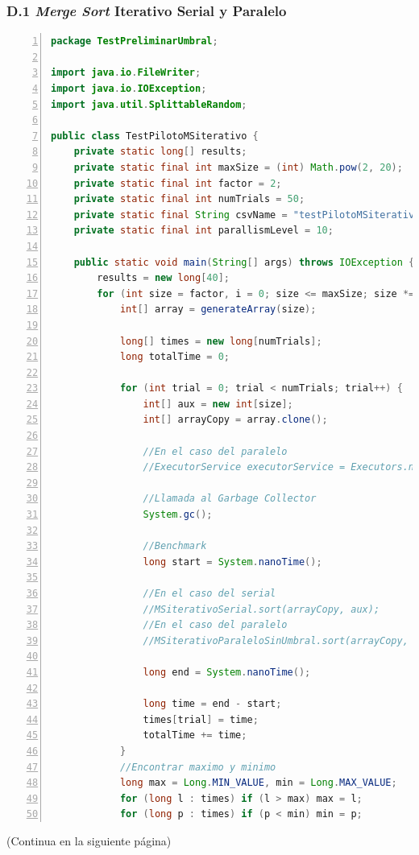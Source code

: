\documentclass[titlepage]{article}
\begin{document}
\subsubsection*{D.1 \textit{Merge Sort} Iterativo Serial y Paralelo}
\begin{lstlisting}[language=java, frame=single,numbers=left, float=h!, breaklines=true]
package TestPreliminarUmbral;

import java.io.FileWriter;
import java.io.IOException;
import java.util.SplittableRandom;

public class TestPilotoMSiterativo {
	private static long[] results;
	private static final int maxSize = (int) Math.pow(2, 20);
	private static final int factor = 2;
	private static final int numTrials = 50;
	private static final String csvName = "testPilotoMSiterativo.csv";
	private static final int parallismLevel = 10;
	
	public static void main(String[] args) throws IOException {
		results = new long[40];
		for (int size = factor, i = 0; size <= maxSize; size *= factor, i++) {
			int[] array = generateArray(size);
			
			long[] times = new long[numTrials];
			long totalTime = 0;
			
			for (int trial = 0; trial < numTrials; trial++) {
				int[] aux = new int[size];
				int[] arrayCopy = array.clone();
				
				//En el caso del paralelo
				//ExecutorService executorService = Executors.newFixedThreadPool(parallismLevel);
				
				//Llamada al Garbage Collector
				System.gc();
				
				//Benchmark
				long start = System.nanoTime();
				
				//En el caso del serial
				//MSiterativoSerial.sort(arrayCopy, aux);
				//En el caso del paralelo
				//MSiterativoParaleloSinUmbral.sort(arrayCopy, aux, executorService);
				
				long end = System.nanoTime();
				
				long time = end - start;
				times[trial] = time;
				totalTime += time;
			}
			//Encontrar maximo y minimo
			long max = Long.MIN_VALUE, min = Long.MAX_VALUE;
			for (long l : times) if (l > max) max = l;
			for (long p : times) if (p < min) min = p;
\end{lstlisting}
(Continua en la siguiente página)
\end{document}
